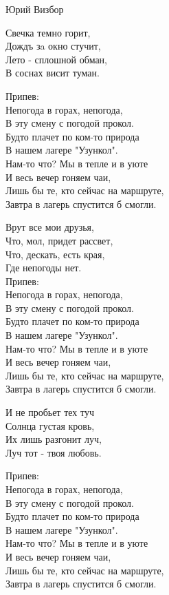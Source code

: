 {Юрий Визбор}
\begin{text}
Свечка темно горит,\\
Дождъ зa окно стучит,\\
Лето - сплошной обман,\\
В соснах висит туман.

Припев:\\
Непогода в горах, непогода,\\
В эту смену с погодой прокол.\\
Будто плачет по ком-то природа\\
В нашем лагере "Узункол".\\
Нам-то что? Мы в тепле и в уюте\\
И весь вечер гоняем чаи,\\
Лишь бы те, кто сейчас на маршруте,\\
Завтра в лагерь спустится б смогли.

Врут все мои друзья,\\
Что, мол, придет рассвет,\\
Что, дескать, есть края,\\
Где непогоды нет.\\

Припев:\\
Непогода в горах, непогода,\\
В эту смену с погодой прокол.\\
Будто плачет по ком-то природа\\
В нашем лагере "Узункол".\\
Нам-то что? Мы в тепле и в уюте\\
И весь вечер гоняем чаи,\\
Лишь бы те, кто сейчас на маршруте,\\
Завтра в лагерь спустится б смогли.

И не пробьет тех туч\\
Солнца густая кровь,\\
Их лишь разгонит луч,\\
Луч тот - твоя любовь.

Припев:\\
Непогода в горах, непогода,\\
В эту смену с погодой прокол.\\
Будто плачет по ком-то природа\\
В нашем лагере "Узункол".\\
Нам-то что? Мы в тепле и в уюте\\
И весь вечер гоняем чаи,\\
Лишь бы те, кто сейчас на маршруте,\\
Завтра в лагерь спустится б смогли.
\end{text}
